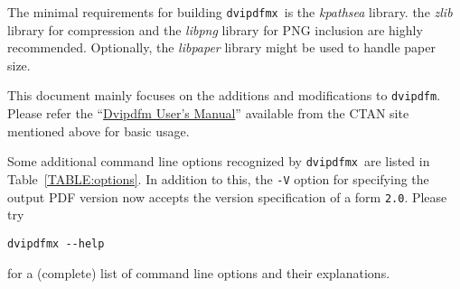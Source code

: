 \documentclass[a4paper,xetex,oneside]{book}
\newcommand{\code}[1]{\mbox{\texttt{#1}}}
\newcommand{\keyword}[1]{\textit{#1}}
\newcommand{\dvipdfm}{\texttt{dvipdfm}}
\newcommand{\dvipdfmx}{\texttt{dvipdfmx}}
\begin{document}
The minimal requirements for building \dvipdfmx\ is the \keyword{kpathsea} library.
the \keyword{zlib} library for compression and the \keyword{libpng} library for PNG
inclusion are highly recommended.
Optionally, the \keyword{libpaper} library might be used to handle paper size.

This document mainly focuses on the additions and modifications to \dvipdfm.
Please refer the
``\href{http://mirrors.ctan.org/dviware/dvipdfm/dvipdfm.pdf}{Dvipdfm User's Manual}''
available from the CTAN site mentioned above for basic usage.

Some additional command line options recognized by \dvipdfmx\ are listed in
Table~\ref{TABLE:options}. In addition to this, the \code{-V} option for specifying
the output PDF version now accepts the version specification of a form \code{2.0}.
Please try
\begin{lstlisting}
dvipdfmx --help
\end{lstlisting}
for a (complete) list of command line options and their explanations.
\end{document}

